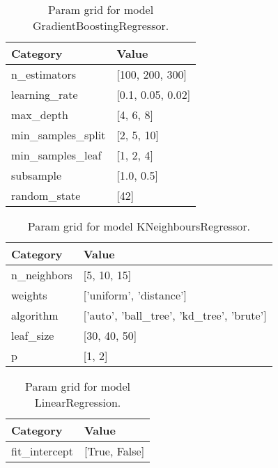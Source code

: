 \documentclass{article}%
\begin{document}
%


\begin{table}[H]%
\begin{center}%
\renewcommand{\arraystretch}{1.5}%
\begin{tabular}{l l}%
\hline%
\textbf{Category}&\textbf{Value}\\%
\hline%
n\_estimators&{[}100, 200, 300{]}\\%
learning\_rate&{[}0.1, 0.05, 0.02{]}\\%
max\_depth&{[}4, 6, 8{]}\\%
min\_samples\_split&{[}2, 5, 10{]}\\%
min\_samples\_leaf&{[}1, 2, 4{]}\\%
subsample&{[}1.0, 0.5{]}\\%
random\_state&{[}42{]}\\%
\hline%
\end{tabular}%
\end{center}%
\caption{Param grid for model GradientBoostingRegressor.}%
\end{table}

%


\begin{table}[H]%
\begin{center}%
\renewcommand{\arraystretch}{1.5}%
\begin{tabular}{l l}%
\hline%
\textbf{Category}&\textbf{Value}\\%
\hline%
n\_neighbors&{[}5, 10, 15{]}\\%
weights&{[}'uniform', 'distance'{]}\\%
algorithm&{[}'auto', 'ball\_tree', 'kd\_tree', 'brute'{]}\\%
leaf\_size&{[}30, 40, 50{]}\\%
p&{[}1, 2{]}\\%
\hline%
\end{tabular}%
\end{center}%
\caption{Param grid for model KNeighboursRegressor.}%
\end{table}

%


\begin{table}[H]%
\begin{center}%
\renewcommand{\arraystretch}{1.5}%
\begin{tabular}{l l}%
\hline%
\textbf{Category}&\textbf{Value}\\%
\hline%
fit\_intercept&{[}True, False{]}\\%
\hline%
\end{tabular}%
\end{center}%
\caption{Param grid for model LinearRegression.}%
\end{table}
\end{document}
